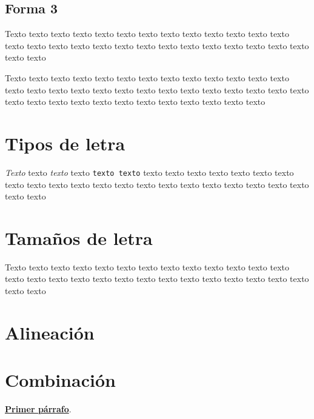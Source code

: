 \documentclass{article}
\begin{document}
\subsection{Forma 3}
Texto texto texto texto texto texto texto texto texto texto texto texto texto texto texto texto texto texto texto texto texto texto texto texto texto texto texto texto texto\newline

Texto texto texto texto texto texto texto texto texto texto texto texto texto texto texto texto texto texto texto texto texto texto texto texto texto texto texto texto texto texto texto texto texto texto texto texto texto texto texto 
\newpage
\section{Tipos de letra}

\textit{\lipsum[1]}

\textit{Texto} texto {\sl texto} texto \texttt{texto texto} texto texto texto texto texto texto texto texto texto texto texto texto texto texto texto texto texto texto texto texto texto texto texto

\section{Tamaños de letra}

{\tiny \lipsum[2]}

{\Huge Texto} texto {\scriptsize texto} texto texto {\large texto texto texto} texto texto texto texto texto texto texto texto texto texto texto texto texto texto texto texto texto texto texto texto texto

\section{Alineación}

\begin{center}
    \lipsum[3]
\end{center}

{
    \centering
    \lipsum[6]
}

\section{Combinación}

\begin{flushleft}
    {\large \underline{\bf Primer párrafo}}. \lipsum[1]
\end{flushleft}
\end{document}
